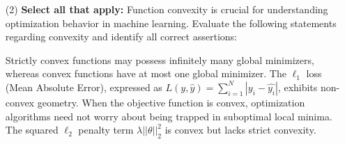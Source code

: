 \documentclass[11pt,addpoints,answers]{exam}
\newcommand{\sall}{\textbf{Select all that apply: }}
\begin{document}
\begin{enumerate}
\begin{enumerate}[label=\alph*), itemsep=10pt]
\begin{enumerate}[label=(\roman*), leftmargin=*]
			\end{enumerate}
			
			\vspace*{7mm}
			\item[(2)] \sall Function convexity is crucial for understanding optimization behavior in machine learning. Evaluate the following statements regarding convexity and identify all correct assertions:
			
			\begin{checkboxes} 
				\checkboxchar{$\Box$} \checkedchar{$\blacksquare$}
				\choice Strictly convex functions may possess infinitely many global minimizers, whereas convex functions have at most one global minimizer.
				\choice The $\ell_1$ loss (Mean Absolute Error), expressed as $L(y, \hat{y}) = \sum_{i=1}^N |y_i - \hat{y_i}|$, exhibits non-convex geometry.
				\CorrectChoice When the objective function is convex, optimization algorithms need not worry about being trapped in suboptimal local minima.
				\choice The squared $\ell_2$ penalty term $\lambda ||\theta||_{2}^{2}$ is convex but lacks strict convexity.
			\end{checkboxes}
			
		\end{enumerate}
		
	\end{enumerate}
	\newpage	
	
\end{document}

